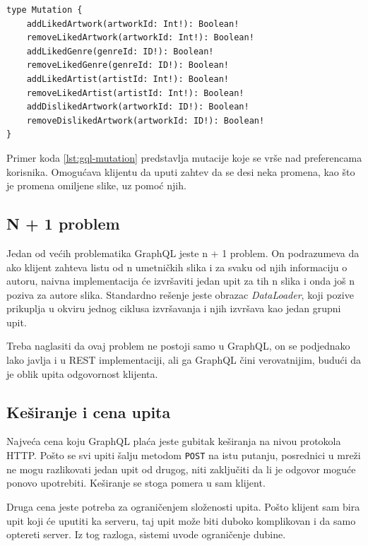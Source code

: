 \documentclass[12pt,oneside]{memoir}
\begin{document}
\begin{lstlisting}[language=GraphQLSchema,
  caption={Primer mutacije nad preferencama korisnika},
  label={lst:gql-mutation}]
type Mutation {
    addLikedArtwork(artworkId: Int!): Boolean!
    removeLikedArtwork(artworkId: Int!): Boolean!
    addLikedGenre(genreId: ID!): Boolean!
    removeLikedGenre(genreId: ID!): Boolean!
    addLikedArtist(artistId: Int!): Boolean!
    removeLikedArtist(artistId: Int!): Boolean!
    addDislikedArtwork(artworkId: ID!): Boolean!
    removeDislikedArtwork(artworkId: ID!): Boolean!
}
\end{lstlisting}

Primer koda \ref{lst:gql-mutation} predstavlja mutacije koje se vrše nad preferencama korisnika. Omogućava 
klijentu da uputi zahtev da se desi neka promena, kao što je promena omiljene slike, uz pomoć njih.

\subsection{N + 1 problem}

Jedan od većih problematika GraphQL jeste n + 1 problem. On podrazumeva da ako klijent zahteva listu od n umetničkih slika i za svaku od njih informaciju o autoru,  
naivna implementacija će izvršaviti jedan upit za tih n slika i onda još n poziva za autore slika. 
Standardno rešenje jeste obrazac
\textit{DataLoader}, koji pozive prikuplja u okviru jednog ciklusa izvršavanja
i  njih izvršava kao jedan grupni upit.

Treba naglasiti da ovaj problem ne postoji samo u GraphQL, on se
podjednako lako javlja i u REST implementaciji, ali ga GraphQL čini
verovatnijim, budući da je oblik upita odgovornost klijenta.


\subsection{Keširanje i cena upita}

Najveća cena koju GraphQL plaća jeste gubitak keširanja na nivou protokola
HTTP. Pošto se svi upiti šalju metodom \texttt{POST} na istu putanju,
posrednici u mreži ne mogu razlikovati jedan upit od drugog, niti zaključiti da
li je odgovor moguće ponovo upotrebiti. Keširanje se stoga pomera u sam
klijent.

Druga cena jeste potreba za ograničenjem složenosti upita. Pošto klijent sam bira
upit koji će uputiti ka serveru, taj upit može biti duboko komplikovan i da samo optereti server.
Iz tog razloga, sistemi uvode ograničenje dubine.
\end{document}
